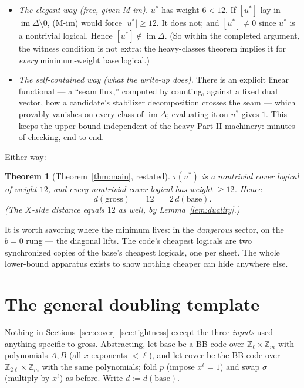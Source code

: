 \documentclass[11pt]{article}
\theoremstyle{plain}
\newtheorem{theorem}{Theorem}[section]
\theoremstyle{definition}
\theoremstyle{remark}
\newcommand{\Z}{\mathbb{Z}}
\newcommand{\imD}{\operatorname{im}\Delta}
\newcommand{\base}{\mathrm{base}}
\newcommand{\cov}{\mathrm{cover}}
\newcommand{\wt}[1]{\lvert #1\rvert}
\begin{document}
\begin{itemize}[leftmargin=2em]
\item \emph{The elegant way (free, given M-im).} $u^*$ has weight $6 < 12$.
  If $[u^*]$ lay in $\imD \setminus 0$, (M-im) would force $\wt{u^*} \geq
  12$. It does not; and $[u^*] \neq 0$ since $u^*$ is a nontrivial logical.
  Hence $[u^*] \notin \imD$. (So within the completed argument, the witness
  condition is not extra: the heavy-classes theorem implies it for
  \emph{every} minimum-weight base logical.)
\item \emph{The self-contained way (what the write-up does).} There is an
  explicit linear functional --- a ``seam flux,'' computed by counting, against
  a fixed dual vector, how a candidate's stabilizer decomposition crosses the
  seam --- which provably vanishes on every class of $\imD$; evaluating it on
  $u^*$ gives $1$. This keeps the upper bound independent of the heavy Part-II
  machinery: minutes of checking, end to end.
\end{itemize}

Either way:

\begin{theorem}[Theorem~\ref{thm:main}, restated]
$\tau(u^*)$ is a nontrivial cover logical of weight $12$, and every
nontrivial cover logical has weight $\geq 12$. Hence
\[
d(\mathrm{gross}) \;=\; 12 \;=\; 2\, d(\base).
\]
(The $X$-side distance equals $12$ as well, by Lemma~\ref{lem:duality}.)
\end{theorem}

It is worth savoring where the minimum lives: in the \emph{dangerous} sector,
on the $b = 0$ rung --- the diagonal lifts. The code's cheapest logicals are
two synchronized copies of the base's cheapest logicals, one per sheet. The
whole lower-bound apparatus exists to show nothing cheaper can hide anywhere
else.

\section{The general doubling template}
\label{sec:template}

Nothing in Sections~\ref{sec:cover}--\ref{sec:tightness} except the three
\emph{inputs} used anything specific to gross. Abstracting, let $\base$ be a
BB code over $\Z_\ell \times \Z_m$ with polynomials $A, B$ (all $x$-exponents
$< \ell$), and let $\cov$ be the BB code over $\Z_{2\ell} \times \Z_m$ with
the same polynomials; fold $p$ (impose $x^\ell = 1$) and swap $\sigma$
(multiply by $x^\ell$) as before. Write $d := d(\base)$.
\end{document}
